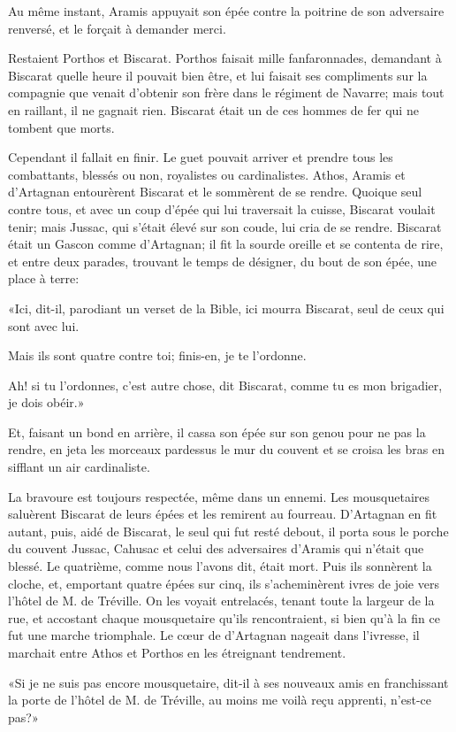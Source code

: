 Au même instant, Aramis appuyait son épée contre la poitrine de son adversaire renversé, et le forçait à demander merci. 

Restaient Porthos et Biscarat. Porthos faisait mille fanfaronnades, demandant à Biscarat quelle heure il pouvait bien être, et lui faisait ses compliments sur la compagnie que venait d'obtenir son frère dans le régiment de Navarre; mais tout en raillant, il ne gagnait rien. Biscarat était un de ces hommes de fer qui ne tombent que morts. 

Cependant il fallait en finir. Le guet pouvait arriver et prendre tous les combattants, blessés ou non, royalistes ou cardinalistes. Athos, Aramis et d'Artagnan entourèrent Biscarat et le sommèrent de se rendre. Quoique seul contre tous, et avec un coup d'épée qui lui traversait la cuisse, Biscarat voulait tenir; mais Jussac, qui s'était élevé sur son coude, lui cria de se rendre. Biscarat était un Gascon comme d'Artagnan; il fit la sourde oreille et se contenta de rire, et entre deux parades, trouvant le temps de désigner, du bout de son épée, une place à terre: 

«Ici, dit-il, parodiant un verset de la Bible, ici mourra Biscarat, seul de ceux qui sont avec lui. 

\speak  Mais ils sont quatre contre toi; finis-en, je te l'ordonne. 

\speak  Ah! si tu l'ordonnes, c'est autre chose, dit Biscarat, comme tu es mon brigadier, je dois obéir.» 

Et, faisant un bond en arrière, il cassa son épée sur son genou pour ne pas la rendre, en jeta les morceaux pardessus le mur du couvent et se croisa les bras en sifflant un air cardinaliste. 

La bravoure est toujours respectée, même dans un ennemi. Les mousquetaires saluèrent Biscarat de leurs épées et les remirent au fourreau. D'Artagnan en fit autant, puis, aidé de Biscarat, le seul qui fut resté debout, il porta sous le porche du couvent Jussac, Cahusac et celui des adversaires d'Aramis qui n'était que blessé. Le quatrième, comme nous l'avons dit, était mort. Puis ils sonnèrent la cloche, et, emportant quatre épées sur cinq, ils s'acheminèrent ivres de joie vers l'hôtel de M. de Tréville. On les voyait entrelacés, tenant toute la largeur de la rue, et accostant chaque mousquetaire qu'ils rencontraient, si bien qu'à la fin ce fut une marche triomphale. Le cœur de d'Artagnan nageait dans l'ivresse, il marchait entre Athos et Porthos en les étreignant tendrement. 

«Si je ne suis pas encore mousquetaire, dit-il à ses nouveaux amis en franchissant la porte de l'hôtel de M. de Tréville, au moins me voilà reçu apprenti, n'est-ce pas?»